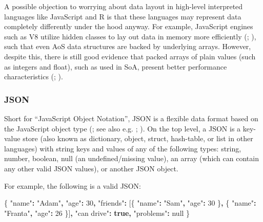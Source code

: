 \documentclass[
]{book}
\newenvironment{Shaded}{\begin{snugshade}}{\end{snugshade}}
\newcommand{\DataTypeTok}[1]{\textcolor[rgb]{0.13,0.29,0.53}{#1}}
\newcommand{\DecValTok}[1]{\textcolor[rgb]{0.00,0.00,0.81}{#1}}
\newcommand{\KeywordTok}[1]{\textcolor[rgb]{0.13,0.29,0.53}{\textbf{#1}}}
\newcommand{\NormalTok}[1]{#1}
\newcommand{\OperatorTok}[1]{\textcolor[rgb]{0.81,0.36,0.00}{\textbf{#1}}}
\newcommand{\StringTok}[1]{\textcolor[rgb]{0.31,0.60,0.02}{#1}}
\theoremstyle{definition}
\theoremstyle{definition}
\theoremstyle{definition}
\theoremstyle{definition}
\theoremstyle{remark}
\begin{document}
A possible objection to worrying about data layout in high-level interpreted languages like JavaScript and R is that these languages may represent data completely differently under the hood anyway. For example, JavaScript engines such as V8 utilize hidden classes to lay out data in memory more efficiently (; ), such that even AoS data structures are backed by underlying arrays. However, despite this, there is still good evidence that packed arrays of plain values (such as integers and float), such as used in SoA, present better performance characteristics (; ).

\subsubsection{JSON}\label{JSON}

Short for ``JavaScript Object Notation'', JSON is a flexible data format based on the JavaScript object type (; see also e.g. ; ). On the top level, a JSON is a key-value store (also known as dictionary, object, struct, hash-table, or list in other languages) with string keys and values of any of the following types: string, number, boolean, null (an undefined/missing value), an array (which can contain any other valid JSON values), or another JSON object.

For example, the following is a valid JSON:

\begin{Shaded}
\begin{Highlighting}[]
\NormalTok{\{}
  \StringTok{"name"}\OperatorTok{:} \StringTok{"Adam"}\OperatorTok{,}
  \StringTok{"age"}\OperatorTok{:} \DecValTok{30}\OperatorTok{,}
  \StringTok{"friends"}\OperatorTok{:}\NormalTok{ [\{ }\StringTok{"name"}\OperatorTok{:} \StringTok{"Sam"}\OperatorTok{,} \StringTok{"age"}\OperatorTok{:} \DecValTok{30}\NormalTok{ \}}\OperatorTok{,}\NormalTok{ \{ }\StringTok{"name"}\OperatorTok{:} \StringTok{"Franta"}\OperatorTok{,} \StringTok{"age"}\OperatorTok{:} \DecValTok{26}\NormalTok{ \}]}\OperatorTok{,}
  \StringTok{"can drive"}\OperatorTok{:} \KeywordTok{true}\OperatorTok{,}
  \StringTok{"problems"}\OperatorTok{:} \DataTypeTok{null}
\NormalTok{\}}
\end{Highlighting}
\end{Shaded}
\end{document}
